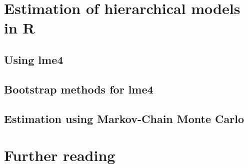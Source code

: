 \documentclass[a4paper,12pt]{article}
\begin{document}
\section{Estimation of hierarchical models in R}
\label{sec:estimationofhierarchicalmodelsinr}

\subsection{Using lme4}
\label{sec:usinglme4}


\subsection{Bootstrap methods for lme4}
\label{sec:bootstrapestimationforlme4}

\subsection{Estimation using Markov-Chain Monte Carlo}
\label{sec:estimationusingmarkovchainmontecarlo}

%
%

\section{Further reading}
\label{sec:furtherreading}


\printbibliography
\end{document}
